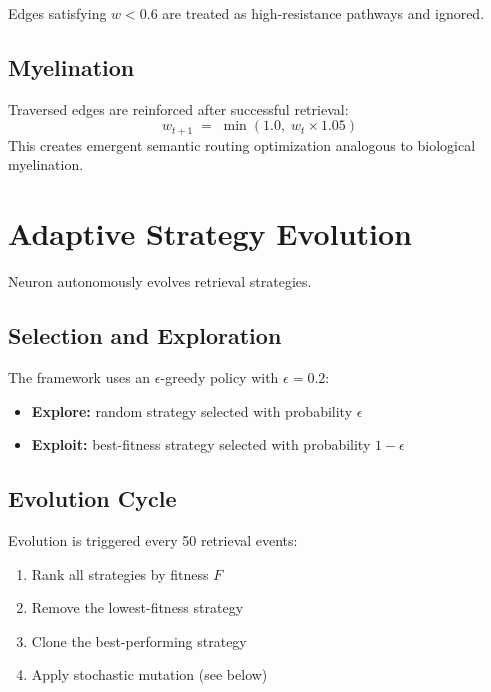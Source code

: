 \documentclass[11pt,a4paper]{article}
\begin{document}
Edges satisfying $w < 0.6$ are treated as high-resistance pathways and ignored.

\subsection{Myelination}

Traversed edges are reinforced after successful retrieval:
\[
    w_{t+1} \;=\; \min(1.0,\;w_t \times 1.05)
\]
This creates emergent semantic routing optimization analogous to biological
myelination.

\section{Adaptive Strategy Evolution}

Neuron autonomously evolves retrieval strategies.

\subsection{Selection and Exploration}

The framework uses an $\epsilon$-greedy policy with $\epsilon = 0.2$:

\begin{itemize}
    \item \textbf{Explore:} random strategy selected with probability $\epsilon$
    \item \textbf{Exploit:} best-fitness strategy selected with probability $1 - \epsilon$
\end{itemize}

\subsection{Evolution Cycle}

Evolution is triggered every 50 retrieval events:

\begin{enumerate}
    \item Rank all strategies by fitness $F$
    \item Remove the lowest-fitness strategy
    \item Clone the best-performing strategy
    \item Apply stochastic mutation (see below)
\end{enumerate}
\end{document}
